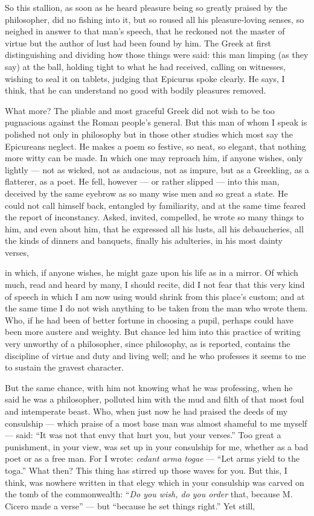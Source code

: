  So this stallion, as soon as he heard pleasure being so greatly praised by the philosopher, did no fishing into it, but so roused all his pleasure-loving senses, so neighed in answer to that man's speech, that he reckoned not the master of virtue but the author of lust had been found by him. The Greek at first distinguishing and dividing how those things were said: this man limping (as they say) at the ball, holding tight to what he had received, calling on witnesses, wishing to seal it on tablets, judging that Epicurus spoke clearly. He says, I think, that he can understand no good with bodily pleasures removed.

 What more? The pliable and most graceful Greek did not wish to be too pugnacious against the Roman people's general. But this man of whom I speak is polished not only in philosophy but in those other studies which most say the Epicureans neglect. He makes a poem so festive, so neat, so elegant, that nothing more witty can be made. In which one may reproach him, if anyone wishes, only lightly — not as wicked, not as audacious, not as impure, but as a Greekling, as a flatterer, as a poet. He fell, however — or rather slipped — into this man, deceived by the same eyebrow as so many wise men and so great a state. He could not call himself back, entangled by familiarity, and at the same time feared the report of inconstancy. Asked, invited, compelled, he wrote so many things to him, and even about him, that he expressed all his lusts, all his debaucheries, all the kinds of dinners and banquets, finally his adulteries, in his most dainty verses,

 in which, if anyone wishes, he might gaze upon his life as in a mirror. Of which much, read and heard by many, I should recite, did I not fear that this very kind of speech in which I am now using would shrink from this place's custom; and at the same time I do not wish anything to be taken from the man who wrote them. Who, if he had been of better fortune in choosing a pupil, perhaps could have been more austere and weighty. But chance led him into this practice of writing very unworthy of a philosopher, since philosophy, as is reported, contains the discipline of virtue and duty and living well; and he who professes it seems to me to sustain the gravest character.

 But the same chance, with him not knowing what he was professing, when he said he was a philosopher, polluted him with the mud and filth of that most foul and intemperate beast. Who, when just now he had praised the deeds of my consulship — which praise of a most base man was almost shameful to me myself — said: ``It was not that envy that hurt you, but your verses.'' Too great a punishment, in your view, was set up in your consulship for me, whether as a bad poet or as a free man. For I wrote: \textit{cedant arma togae} — ``Let arms yield to the toga.'' What then? This thing has stirred up those waves for you. But this, I think, was nowhere written in that elegy which in your consulship was carved on the tomb of the commonwealth: ``\textit{Do you wish, do you order} that, because M. Cicero made a verse'' — but ``because he set things right.'' Yet still,

